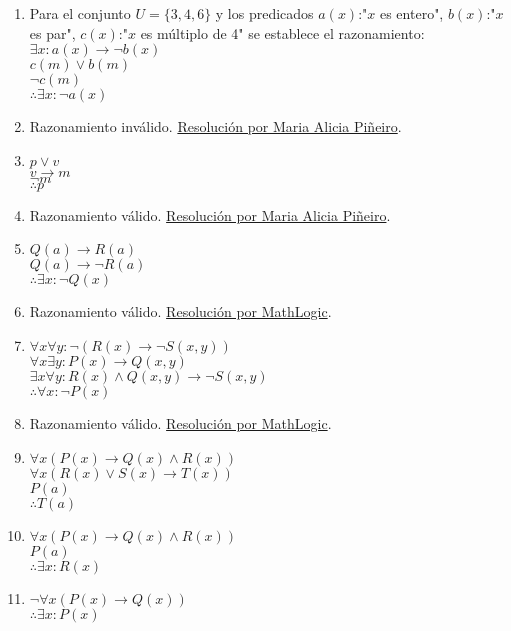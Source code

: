 \documentclass[a4paper]{article}
\newcommand{\answer}{\item[**]}
\newcommand{\then}{\to}
\begin{document}
\begin{enumerate}
\begin{enumerate} [label=(\alph*)]
		\item Para el conjunto $U=\{ 3, 4, 6\}$ y los predicados $a(x)$:"$x$ es entero", $b(x)$:"$x$ es par", $c(x)$:"$x$ es múltiplo de 4" se establece el razonamiento: \\ $\exists x: a(x) \then \neg b(x)$ \\ $c(m) \lor b(m)$ \\ $\neg c(m)$ \\ $\therefore \exists x: \neg a(x)$ 
		\answer Razonamiento inválido. \href{https://youtu.be/PtjWjkc5txI?t=535}{Resolución por Maria Alicia Piñeiro}.

		\item $p \lor v$ \\ $v \then m$ \\ $\neg m$ \\ $\therefore p$ 
		\answer Razonamiento válido. \href{https://youtu.be/0Dcg9nDzkys?t=1194}{Resolución por Maria Alicia Piñeiro}.

		\item $Q(a) \then R(a)$ \\ $Q(a) \then \neg R(a)$ \\ $\therefore \exists x: \neg Q(x)$ 
		\answer Razonamiento válido. \href{https://youtu.be/jf1nYwJEZMs?t=591}{Resolución por MathLogic}.

		\item $\forall x \forall y: \neg (R(x) \then \neg S(x,y))$ \\ $\forall x \exists y: P(x) \then Q(x,y)$ \\ $\exists x \forall y: R(x) \land Q(x,y) \then \neg S(x,y) $ \\ $\therefore \forall x: \neg P(x)$ 
		\answer Razonamiento válido. \href{https://youtu.be/DD5EleyOl-0?t=996}{Resolución por MathLogic}.

		\item $\forall x ( P(x) \then  Q(x) \land  R(x) )$ \\
			$\forall x ( R(x) \lor  S(x) \then  T(x) )$ \\
			$P(a)$ \\
			$\therefore T(a)$

		\item $\forall x ( P(x)\then  Q(x) \land  R(x) )$ \\
			$P(a)$ \\
			$\therefore \exists x: R(x)$

		\item $\neg \forall x ( P(x) \then  Q(x) )$ \\
			$\therefore \exists x: P(x)$


\end{enumerate}
\end{enumerate}
\end{document}
